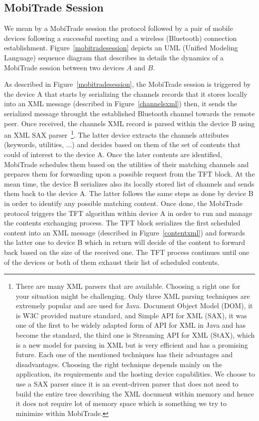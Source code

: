 \subsection{MobiTrade Session}
\label{MobiTrade-session}

We mean by a MobiTrade session the protocol followed by a pair of mobile devices following a successful meeting and a wireless (Bluetooth) connection establishment. Figure~\ref{mobitradesession} depicts an UML (Unified Modeling Language) sequence diagram that describes in details the dynamics of a MobiTrade session between two devices $A$ and $B$. 

As described in Figure~\ref{mobitradesession}, the MobiTrade session is triggered by the device A that starts by serializing the channels records that it stores locally into an XML message (described in Figure~\ref{channelsxml}) then, it sends the serialized message throught the established Bluetooth channel towards the remote peer. Once received, the channels XML record is parsed within the device B using an XML SAX parser~\footnote{There are many XML parsers that are available. Choosing a right one for your situation might be challenging. Only three XML parsing techniques are extremely popular and are used for Java. Document Object Model (DOM), it is W3C provided mature standard, and Simple API for XML (SAX), it was one of the first to be widely adapted form of API for XML in Java and has become the standard, the third one is Streaming API for XML (StAX), which is a new model for parsing in XML but is very efficient and has a promising future. Each one of the mentioned techniques has their advantages and disadvantages. Choosing the right technique depends mainly on the application, its requirements and the hosting device capabilities. We choose to use a SAX parser since it is an event-driven parser that does not need to build the entire tree describing the XML document within memory and hence it does not require lot of memory space which is something we try to minimize within MobiTrade.}. The latter device extracts the channels attributes (keywords, utilities, ...) and decides based on them of the set of contents that could of interest to the device A. Once the later contents are identified, MobiTrade schedules them based on the utilities of their matching channels and prepares them for forwarding upon a possible request from the TFT block. At the mean time, the device B serializes also its locally stored list of channels and sends them back to the device A. The latter follows the same steps as done by device B in order to identify any possible matching content. Once done, the MobiTrade protocol triggers the TFT algorithm within device A in order to run and manage the contents exchanging process. The TFT block serializes the first scheduled content into an XML message (described in Figure~\ref{contentxml}) and forwards the latter one to device B which in return will decide of the content to forward back based on the size of the received one. The TFT process continues until one of the devices or both of them exhaust their list of scheduled contents. 

